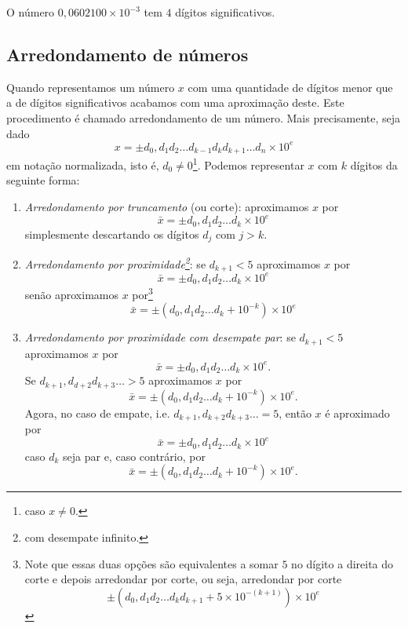\begin{ex} O número $0,0602100\times 10^{-3}$ tem $4$ dígitos significativos.
\end{ex}

\subsection{Arredondamento de números}

Quando representamos um número $x$ com uma quantidade de dígitos menor que a de dígitos significativos acabamos com uma aproximação deste. Este procedimento é chamado arredondamento de um número. Mais precisamente, seja dado
\begin{equation*}
  x = \pm d_0,d_1d_2\ldots d_{k-1}d_kd_{k+1}\ldots d_n \times 10^e
\end{equation*}
em notação normalizada, isto é, $d_0\neq 0$\footnote{caso $x\neq 0$.}. Podemos representar $x$ com $k$ dígitos da seguinte forma:
\begin{enumerate}
\item \emph{Arredondamento por truncamento} (ou corte): aproximamos $x$ por
$$
  \bar{x} = \pm d_{0},d_{1}d_{2}\ldots d_{k}\times 10^e
$$
simplesmente descartando os dígitos $d_{j}$ com $j > k$.
\item \emph{Arredondamento por proximidade\footnote{com desempate infinito.}}: se $d_{k+1}<5$ aproximamos $x$ por
$$
  \bar{x} = \pm d_0,d_1d_2\ldots d_{k}\times 10^{e}
$$
senão aproximamos $x$ por\footnote{Note que essas duas opções são equivalentes a somar $5$ no dígito a direita do corte e depois arredondar por corte, ou seja, arredondar por corte
$$ \pm(d_0,d_1d_2\ldots d_kd_{k+1}+ 5 \times10^{-(k+1)} )\times 10^{e} $$}
$$
 \bar{x} = \pm (d_0,d_1d_2\ldots d_{k} + 10^{-k}) \times 10^{e}
$$
\item \emph{Arredondamento por proximidade com desempate par}: se $d_{k+1}<5$ aproximamos $x$ por
$$
  \bar{x} = \pm d_0,d_1d_2\ldots d_{k}\times 10^{e}.
$$
Se $d_{k+1},d_{d+2}d_{k+3}\ldots>5$ aproximamos $x$ por
$$
 \bar{x} = \pm (d_0,d_1d_2\ldots d_{k} + 10^{-k}) \times 10^{e}.
$$
Agora, no caso de empate, i.e. $d_{k+1},d_{k+2}d_{k+3}\ldots = 5$, então $x$ é aproximado por
$$
  \bar{x} = \pm d_0,d_1d_2\ldots d_{k}\times 10^{e}
$$
caso $d_{k}$ seja par e, caso contrário, por
$$
 \bar{x} = \pm (d_0,d_1d_2\ldots d_{k} + 10^{-k}) \times 10^{e}.
$$
\end{enumerate}

